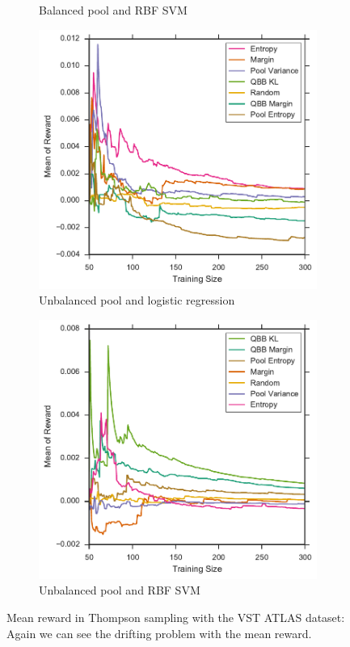 \begin{figure}[p]
\begin{subfigure}{.5\textwidth}
		\caption{Balanced pool and RBF SVM}
		\label{fig:vstatlas_br_avg_rewards}
	\end{subfigure}
	\begin{subfigure}{.5\textwidth}
		\centering
		\includegraphics[width=\textwidth]{figures/5_thompson/vstatlas_ul_avg_rewards}
		\caption{Unbalanced pool and logistic regression}
		\label{fig:vstatlas_ul_avg_rewards}
	\end{subfigure}%
	\begin{subfigure}{.5\textwidth}
		\centering
		\includegraphics[width=\linewidth]{figures/5_thompson/vstatlas_ur_avg_rewards}
		\caption{Unbalanced pool and RBF SVM}
		\label{fig:vstatlas_ur_avg_rewards}
	\end{subfigure}
	\caption[Mean reward (average of 10 trials) of heuristics (VST ATLAS)]{
		Mean reward in Thompson sampling with the VST ATLAS dataset: Again we can see the
        drifting problem with the mean reward.}
	\label{fig:vstatlas_avg_rewards}
\end{figure}
